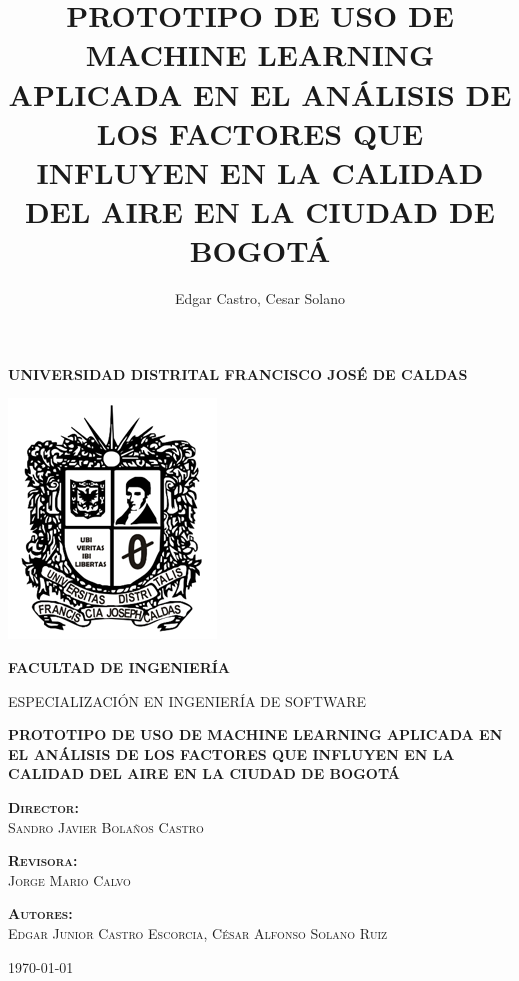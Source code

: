 \documentclass[a4paper, fontsize=16pt, oneside]{book}
\title{PROTOTIPO DE USO DE MACHINE LEARNING APLICADA EN EL ANÁLISIS DE LOS FACTORES QUE INFLUYEN EN LA CALIDAD DEL AIRE EN LA CIUDAD DE BOGOTÁ}
\author{Edgar Castro, Cesar Solano}
\begin{document}
	
	
\begin{titlepage}	
	\begin{center}
		{\scshape\Large\bfseries UNIVERSIDAD DISTRITAL FRANCISCO JOSÉ DE CALDAS \par}
		\vspace{1cm}
		\includegraphics{images/Escudo.png}\par
		\vspace{0,7cm}
		{\scshape\Large\bfseries FACULTAD DE INGENIERÍA \par}
		\vspace{0,5cm}
		{\scshape\normalsize ESPECIALIZACIÓN EN INGENIERÍA DE SOFTWARE\par}
		\vspace{0.3cm}
		
		{\scshape\normalsize\bfseries PROTOTIPO DE USO DE MACHINE LEARNING APLICADA EN EL ANÁLISIS DE LOS FACTORES QUE INFLUYEN EN LA CALIDAD DEL AIRE EN LA CIUDAD DE BOGOTÁ\par}
		\vspace{2cm}
	\end{center}

	\begin{multicols}{3}
		\begin{center}
			\scshape\normalsize\textbf{Director:}\\ Sandro Javier Bolaños Castro \par
			
			\columnbreak
			\scshape\normalsize\textbf{Revisora:}\\Jorge Mario Calvo \par
			
			\columnbreak
			\scshape\normalsize\textbf{Autores:}\\Edgar Junior Castro Escorcia, César Alfonso Solano Ruiz\par
		\end{center}
	\end{multicols}

	\vfill

	{\begin{center}
			\scshape\Large\monthyeardate\today
	\end{center}}
	
\end{titlepage}
\end{document}

